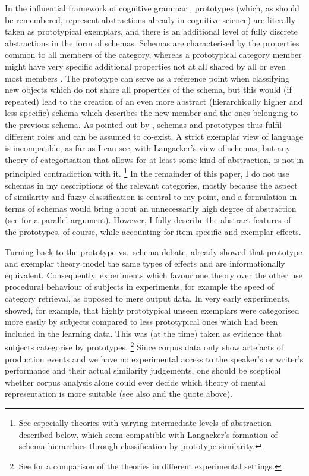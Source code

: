 In the influential framework of cognitive grammar \citep{Langacker1987}, prototypes (which, as should be remembered, represent abstractions already in cognitive science) are literally taken as prototypical exemplars, and there is an additional level of fully discrete abstractions in the form of schemas.
Schemas are characterised by the properties common to all members of the category, whereas a prototypical category member might have very specific additional properties not at all shared by all or even most members \citep[371-375]{Langacker1987}.
The prototype can serve as a reference point when classifying new objects which do not share all properties of the schema, but this would (if repeated) lead to the creation of an even more abstract (hierarchically higher and less specific) schema which describes the new member and the ones belonging to the previous schema.
As pointed out by \citet[136--137]{Langacker1987}, schemas and prototypes thus fulfil different roles and can be assumed to co-exist.
A strict exemplar view of language is incompatible, as far as I can see, with Langacker's view of schemas, but any theory of categorisation that allows for at least some kind of abstraction, is not in principled contradiction with it.%
\footnote{See especially theories with varying intermediate levels of abstraction described below, which seem compatible with Langacker's formation of schema hierarchies through classification by prototype similarity.}
In the remainder of this paper, I do not use schemas in my descriptions of the relevant categories, mostly because the aspect of similarity and fuzzy classification is central to my point, and a formulation in terms of schemas would bring about an unnecessarily high degree of abstraction (see \citealp[70--71]{Taylor2003} for a parallel argument).
However, I fully describe the abstract features of the prototypes, of course, while accounting for item-specific and exemplar effects.

Turning back to the prototype vs.\ schema debate, \cite{Barsalou1990} already showed that prototype and exemplar theory model the same types of effects and are informationally equivalent.
Consequently, experiments which favour one theory over the other use procedural behaviour of subjects in experiments, for example the speed of category retrieval, as opposed to mere output data.
In very early experiments, \cite{PosnerKeele1968} showed, for example, that highly prototypical unseen exemplars were categorised more easily by subjects compared to less prototypical ones which had been included in the learning data.
This was (at the time) taken as evidence that subjects categorise by prototypes.%
\footnote{See \citet{StormsEa2000} for a comparison of the theories in different experimental settings.}
Since corpus data only show artefacts of production events and we have no experimental access to the speaker's or writer's performance and their actual similarity judgements, one should be sceptical whether corpus analysis alone could ever decide which theory of mental representation is more suitable (see also \citealp[22]{Gries2003} and the \citealp[486--487]{Dabrowska2016} quote above).


